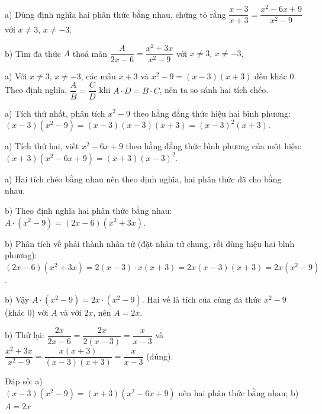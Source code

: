 \begin{problem}[8DS-PS-012]
a) Dùng định nghĩa hai phân thức bằng nhau, chứng tỏ rằng $\dfrac{x - 3}{x + 3} = \dfrac{x^2 - 6x + 9}{x^2 - 9}$ với $x \neq 3$, $x \neq -3$.

b) Tìm đa thức $A$ thoả mãn $\dfrac{A}{2x - 6} = \dfrac{x^2 + 3x}{x^2 - 9}$ với $x \neq 3$, $x \neq -3$.

\begin{solution}
a) Với $x \neq 3$, $x \neq -3$, các mẫu $x + 3$ và $x^2 - 9 = (x - 3)(x + 3)$ đều khác $0$. Theo định nghĩa, $\dfrac{A}{B} = \dfrac{C}{D}$ khi $A \cdot D = B \cdot C$, nên ta so sánh hai tích chéo.

a) Tích thứ nhất, phân tích $x^2 - 9$ theo hằng đẳng thức hiệu hai bình phương: $(x - 3)(x^2 - 9) = (x - 3)(x - 3)(x + 3) = (x - 3)^2(x + 3)$.

a) Tích thứ hai, viết $x^2 - 6x + 9$ theo hằng đẳng thức bình phương của một hiệu: $(x + 3)(x^2 - 6x + 9) = (x + 3)(x - 3)^2$.

a) Hai tích chéo bằng nhau nên theo định nghĩa, hai phân thức đã cho bằng nhau.

b) Theo định nghĩa hai phân thức bằng nhau: $A \cdot (x^2 - 9) = (2x - 6)(x^2 + 3x)$.

b) Phân tích vế phải thành nhân tử (đặt nhân tử chung, rồi dùng hiệu hai bình phương): $(2x - 6)(x^2 + 3x) = 2(x - 3) \cdot x(x + 3) = 2x(x - 3)(x + 3) = 2x(x^2 - 9)$.

b) Vậy $A \cdot (x^2 - 9) = 2x \cdot (x^2 - 9)$. Hai vế là tích của cùng đa thức $x^2 - 9$ (khác $0$) với $A$ và với $2x$, nên $A = 2x$.

b) Thử lại: $\dfrac{2x}{2x - 6} = \dfrac{2x}{2(x - 3)} = \dfrac{x}{x - 3}$ và $\dfrac{x^2 + 3x}{x^2 - 9} = \dfrac{x(x + 3)}{(x - 3)(x + 3)} = \dfrac{x}{x - 3}$ (đúng).

Đáp số: a) $\boxed{(x - 3)(x^2 - 9) = (x + 3)(x^2 - 6x + 9) \text{ nên hai phân thức bằng nhau}}$; b) $\boxed{A = 2x}$
\end{solution}
\end{problem}

